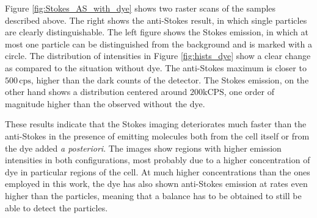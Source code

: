 \documentclass[journal=nalefd,manuscript=letter]{achemso}
\newcommand{\CPS}{\ensuremath{\,\textrm{cps}}}
\newcommand{\atto}{\ensuremath{\textrm{ATTO}\,647\textrm{N}}}
\begin{document}
Figure \ref{fig:Stokes_AS_with_dye} shows two raster scans of the samples
described above. The right shows the anti-Stokes result, in which
single particles are clearly distinguishable. The left figure shows the
Stokes emission, in which at most one particle can be distinguished from the
background and is marked with a circle. The distribution of intensities in
Figure \ref{fig:hists_dye} show a clear change as compared to the situation without
dye. The anti-Stokes maximum is closer to $500\CPS$, higher than
the dark counts of the detector. The Stokes emission, on the other hand shows a
distribution centered around $200\textrm{kCPS}$, one order of
magnitude higher than the observed without the dye.


These results indicate that the Stokes imaging deteriorates much faster than the
anti-Stokes in the presence of emitting molecules both from the cell itself or
from the dye added \textit{a posteriori}. The images show regions with higher
emission intensities in both configurations, most probably due to a higher concentration
of dye in particular regions of the cell. At much higher concentrations than
the ones employed in this work, the dye has also shown anti-Stokes emission at
rates even higher than the particles, meaning that a balance has to be obtained
to still be able to detect the particles.
\end{document}
